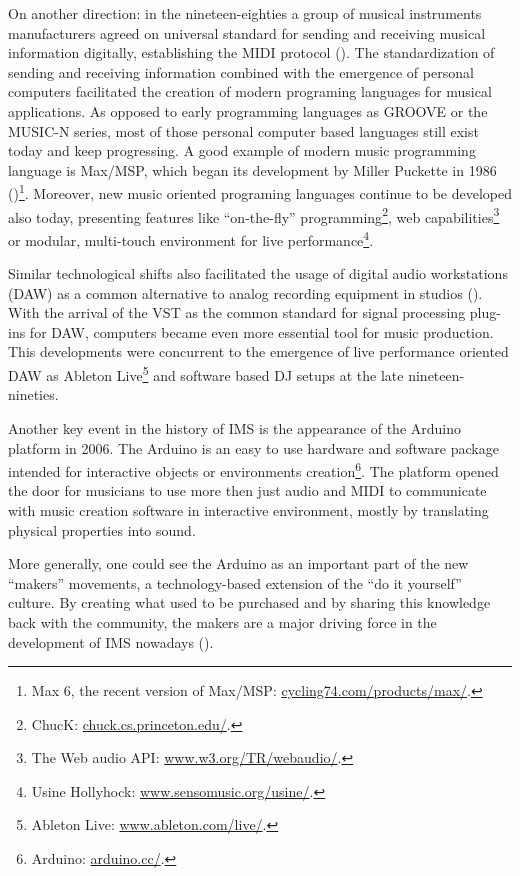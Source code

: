 \documentclass[a4paper,11pt]{article}
\begin{document}
On another direction: in the nineteen-eighties a group of musical instruments manufacturers agreed on universal standard for sending and receiving musical information digitally, establishing the MIDI protocol (\cite{web:quinn}).
The standardization of sending and receiving information combined with the emergence of personal computers facilitated the creation of modern programing languages for musical applications.
As opposed to early programming languages as GROOVE or the MUSIC-N series, most of those personal computer based languages still exist today and keep progressing. A good example of modern music programming language is Max/MSP, which began its development by Miller Puckette in 1986 (\cite[p. 16]{winkler01})\footnote{Max 6, the recent version of Max/MSP: \href{http://cycling74.com/products/max/}{cycling74.com/products/max/}.}.
Moreover, new music oriented programing languages continue to be developed also today, presenting features like ``on-the-fly'' programming\footnote{ChucK: \href{http://chuck.cs.princeton.edu/}{chuck.cs.princeton.edu/}.}, web capabilities\footnote{The Web audio API: \href{http://www.w3.org/TR/webaudio/}{www.w3.org/TR/webaudio/}.} or modular, multi-touch environment for live performance\footnote{Usine Hollyhock: \href{http://www.sensomusic.org/usine/}{www.sensomusic.org/usine/}.}.

Similar technological shifts also facilitated the usage of digital audio workstations (DAW) as a common alternative to analog recording equipment in studios (\cite{leider:04}).
With the arrival of the VST as the common standard for signal processing plug-ins for DAW, computers became even more essential tool for music production.
This developments were concurrent to the emergence of live performance oriented DAW as Ableton Live\footnote{Ableton Live: \href{http://www.ableton.com/en/live/}{www.ableton.com/live/}.} and software based DJ setups at the late nineteen-nineties.

Another key event in the history of IMS is the appearance of the Arduino platform in 2006.
The Arduino is an easy to use hardware and software package intended for interactive objects or environments creation\footnote{Arduino: \href{http://arduino.cc/}{arduino.cc/}.}.
The platform opened the door for musicians to use more then just audio and MIDI to communicate with music creation software in interactive environment, mostly by translating physical properties into sound.

More generally, one could see the Arduino as an important part of the new ``makers'' movements, a technology-based extension of the ``do it yourself'' culture.
By creating what used to be purchased and by sharing this knowledge back with the community, the makers are a major driving force in the development of IMS nowadays (\cite{web:kirn12}).
\end{document}
